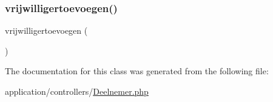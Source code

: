 \subsubsection{\texorpdfstring{vrijwilligertoevoegen()}{vrijwilligertoevoegen()}}
{\footnotesize\ttfamily vrijwilligertoevoegen (\begin{DoxyParamCaption}{ }\end{DoxyParamCaption})}



The documentation for this class was generated from the following file\+:\begin{DoxyCompactItemize}
\item 
application/controllers/\mbox{\hyperlink{_deelnemer_8php}{Deelnemer.\+php}}\end{DoxyCompactItemize}
